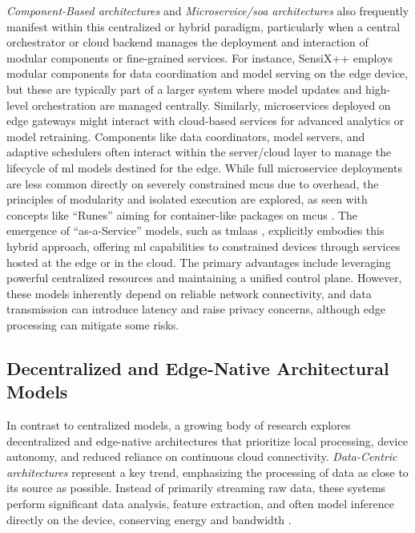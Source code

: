 \textit{Component-Based architectures} and \textit{Microservice/\gls{soa} architectures} also frequently manifest within this centralized or hybrid paradigm, particularly when a central orchestrator or cloud backend manages the deployment and interaction of modular components or fine-grained services. For instance, SensiX++ \cite{minSensiXBringingMLOps2023} employs modular components for data coordination and model serving on the edge device, but these are typically part of a larger system where model updates and high-level orchestration are managed centrally. Similarly, microservices deployed on edge gateways might interact with cloud-based services for advanced analytics or model retraining. Components like data coordinators, model servers, and adaptive schedulers often interact within the server/cloud layer to manage the lifecycle of \gls{ml} models destined for the edge. While full microservice deployments are less common directly on severely constrained \glspl{mcu} due to overhead, the principles of modularity and isolated execution are explored, as seen with concepts like ``Runes'' aiming for container-like packages on \glspl{mcu} \cite{lootusVMContainerizedApproach2022}. The emergence of ``as-a-Service'' models, such as \gls{tmlaas} \cite{doyuTinyMLaaSEcosystemMachine2021}, explicitly embodies this hybrid approach, offering \gls{ml} capabilities to constrained devices through services hosted at the edge or in the cloud. The primary advantages include leveraging powerful centralized resources and maintaining a unified control plane. However, these models inherently depend on reliable network connectivity, and data transmission can introduce latency and raise privacy concerns, although edge processing can mitigate some risks.

\subsection{Decentralized and Edge-Native Architectural Models}
\label{ssec:decentralized_edge_native_arch}

In contrast to centralized models, a growing body of research explores decentralized and edge-native architectures that prioritize local processing, device autonomy, and reduced reliance on continuous cloud connectivity. \textit{Data-Centric architectures} represent a key trend, emphasizing the processing of data as close to its source as possible. Instead of primarily streaming raw data, these systems perform significant data analysis, feature extraction, and often model inference directly on the device, conserving energy and bandwidth \cite{fraidlingTinyMachineLearning2023, antoniniTinyMLOpsFrameworkOrchestrating2022}.

